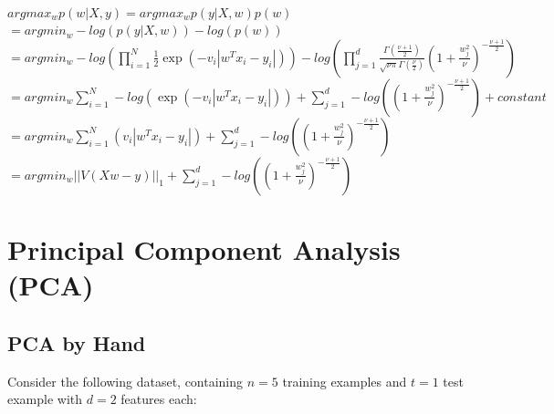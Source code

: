 \documentclass{article}
\begin{document}
{{\\
$argmax_w p(w|X,y)=argmax_w p(y|X,w)p(w)$
\\
$=argmin_w -log(p(y|X,w)) - log(p(w))$
\\
$=argmin_w -log(\prod_{i=1}^{N}\frac 1 2 \exp\left(-v_i|w^Tx_i - y_i|\right))- log(\prod_{j=1}^{d}\frac{\Gamma\left(\frac{\nu + 1}{2}\right)}{\sqrt{\nu\pi}\Gamma\left(\frac \nu 2\right)}\left(1 + \frac{w_j^2}{\nu}\right)^{-\frac{\nu+1}{2}})$
\\
$=argmin_w\sum_{i=1}^{N} -log(\exp\left(-v_i|w^Tx_i - y_i|\right))+\sum_{j=1}^{d}-log((1 + \frac{w_j^2}{\nu})^{-\frac{\nu+1}{2}})+constant$
\\
$=argmin_w\sum_{i=1}^{N} (v_i|w^Tx_i - y_i|)+\sum_{j=1}^{d}-log((1 + \frac{w_j^2}{\nu})^{-\frac{\nu+1}{2}})$
\\
$=argmin_w ||V(Xw-y)||_1+\sum_{j=1}^{d}-log((1 + \frac{w_j^2}{\nu})^{-\frac{\nu+1}{2}})$
}
}



\pagebreak

\section{Principal Component Analysis (PCA)}

\subsection{PCA by Hand}

Consider the following dataset, containing $n=5$ training examples and $t=1$ test example with $d=2$ features each:\\

\end{document}
